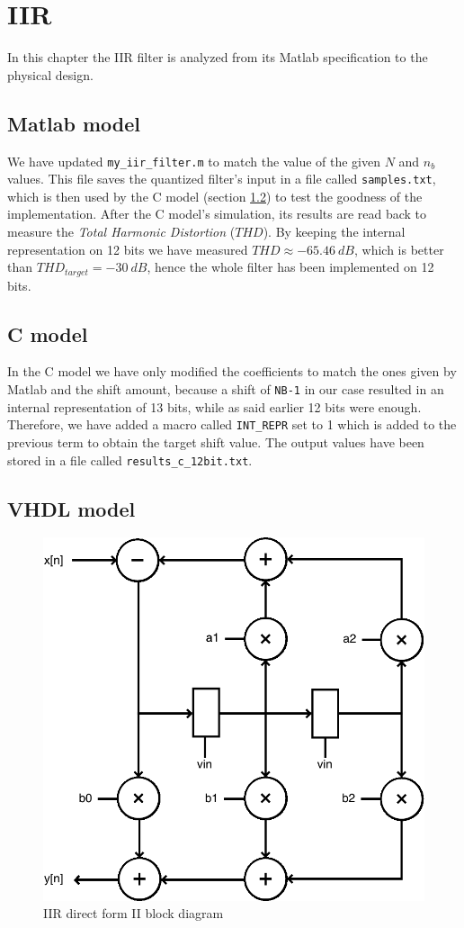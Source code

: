 \chapter{IIR}
\label{chap:iir}

In this chapter the IIR filter is analyzed from its Matlab specification to the physical design.

\section{Matlab model}

We have updated \verb|my_iir_filter.m| to match the value of the given $N$ and $n_{b}$ values.
This file saves the quantized filter's input in a file called \verb|samples.txt|, which is then used
by the C model (section \ref{sec:iir_c_model}) to test the goodness of the implementation.
After the C model's simulation, its results are read back to measure the {\it Total Harmonic Distortion}
($THD$). By keeping the internal representation on 12 bits we have measured $THD \approx -65.46\ dB$, which is
better than $THD_{target} = -30\ dB$, hence the whole filter has been implemented on 12 bits.


\section{C model}
\label{sec:iir_c_model}

In the C model we have only modified the coefficients to match the ones given by Matlab and the shift amount,
because a shift of \verb|NB-1| in our case resulted in an internal representation of 13 bits, while as said
earlier 12 bits were enough. Therefore, we have added a macro called \verb|INT_REPR| set to 1 which is
added to the previous term to obtain the target shift value. The output values have been stored in a file
called \verb|results_c_12bit.txt|.

\section{VHDL model}

\begin{figure}[!ht]
	\centering
	\includegraphics[width=0.4\linewidth]{./chapters/pictures/iir.pdf}
	\caption{IIR direct form II block diagram}
	\label{fig:iir}
\end{figure}

